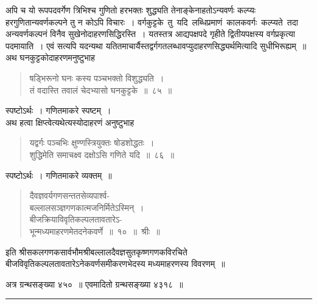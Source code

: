 \documentclass[11pt, openany]{book}
\begin{document}
अपि च यो रूपपदवर्गेण त्रिभिश्च गुणितो हरभक्तः शुद्ध्यति तेनाङ्केनाहतोऽन्यवर्णः कल्प्यः हरगुणितान्यवर्णकल्पने तु न कोऽपि विचारः~। वर्गकुट्टके \,तु \,यदि \,लब्धिप्रमाणं \,कालकवर्गः \,कल्प्यते \,तदा \,अन्यवर्णकल्पनं विनैव 
सुखेनोदाहरणसिद्धिरस्ति~। यतस्तत्र आद्यपक्षपदे गृहीते द्वितीयपक्षस्य
वर्गप्रकृत्या पदमायाति~। एवं सत्यपि यदन्यथा यतितमाचार्यैस्तद्वर्गगतलब्धावप्युदाहरणसिद्ध्यर्थमित्यादि सुधीभिरूह्यम्~॥
\newpage
 अथ घनकुट्टकोदाहरणमनुष्टुभाह\textendash 
 \begin{quote}
     \ex
       षड्भिरूनो घनः कस्य पञ्चभक्तो विशुद्ध्यति~। \\
 तं वदास्ति तवालं चेदभ्यासो घनकुट्टके~॥~८५~॥~
 \end{quote}

स्पष्टोऽर्थः~। गणितमाकरे स्पष्टम्~। \\

\vspace{-3mm}
 अथ हत्वा क्षिप्त्वेत्यथेत्यस्योदाहरणं अनुष्टुभाह\textendash 
\begin{quote}
    \ex
     यद्वर्गः पञ्चभिः क्षुण्णस्त्रियुक्तः षोडशोद्धतः~। \\
 शुद्धिमेति समाचक्ष्व दक्षोऽसि गणिते यदि~॥~८६~॥~
\end{quote}

स्पष्टोऽर्थः~। गणितमाकरे व्यक्तम्~॥ 
\begin{quote}
    \qt
     दैवज्ञवर्यगणसन्ततसेव्यपार्श्व- \\

\vspace{-7mm}
\hspace{1cm} बल्लालसञ्ज्ञगणकात्मजनिर्मितेऽस्मिन्~। \\

\vspace{-7mm}
 बीजक्रियाविवृतिकल्पलतावतारेऽ- \\

\vspace{-7mm}
\hspace{1cm} भून्मध्यमाहरणमेतदनेकवर्णे~॥~१०~॥~श्रीः~॥~
\end{quote}
\begin{center}
     इति श्रीसकलगणकसार्वभौमश्रीबल्लालदैवज्ञसुतकृष्णगणकविरचिते \\ बीजविवृतिकल्पलतावतारेऽनेकवर्णसमीकरणभेदस्य मध्यमाहरणस्य विवरणम्~॥ 
\end{center}

अत्र ग्रन्थसङ्ख्या ४५०~॥ एवमादितो ग्रन्थसङ्ख्या ४३१८~॥
\begin{center}
    \rule{0.1\linewidth}{0.5pt}
\end{center}
\newpage
\end{document}
